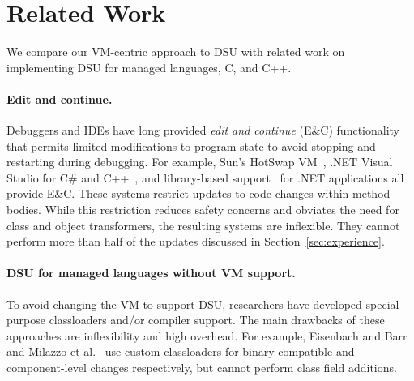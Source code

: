 \section{Related Work}
\label{sec:related}
We compare our VM-centric approach to DSU with related work on
implementing DSU for managed languages, C, and C++.

\paragraph{Edit and continue.}

Debuggers and IDEs have long provided \emph{edit and continue} (E\&C)
functionality that permits limited modifications to program state to
avoid stopping and restarting during debugging. For example, Sun's
HotSwap VM~\cite{JVMhotswap,Dmit01a}, .NET Visual Studio for C\# and
C++~\cite{VSEnC}, and library-based support~\cite{eaddy05enc} for .NET
applications all provide E\&C.  These systems restrict updates to
code changes within method bodies.  While this restriction reduces safety
concerns and obviates the need for class and object transformers, the resulting
systems are inflexible. They cannot perform more than half of the updates discussed in
Section~\ref{sec:experience}.

\paragraph{DSU for managed languages without VM support. } To avoid
changing the VM to support DSU, researchers have developed special-purpose
classloaders and/or compiler support.  The main drawbacks of these
approaches are inflexibility and high overhead.
For example, Eisenbach and Barr~\cite{BarrE03} and Milazzo et
al.~\cite{Milazzo05updates} use custom classloaders for
binary-compatible and component-level changes respectively, but
cannot perform class field additions.



